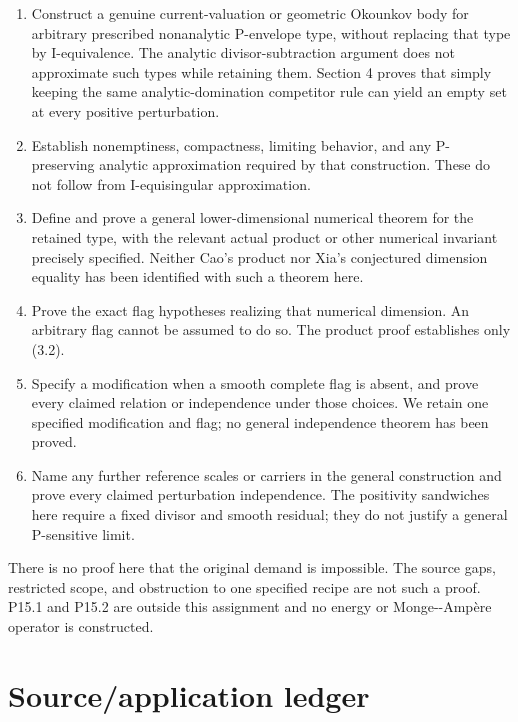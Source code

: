 \documentclass[11pt]{article}
\begin{document}
\begin{enumerate}
\item[1.] Construct a genuine current-\allowbreak{}valuation or geometric Okounkov body for arbitrary prescribed nonanalytic P-\allowbreak{}envelope type, without replacing that type by I-\allowbreak{}equivalence. The analytic divisor-\allowbreak{}subtraction argument does not approximate such types while retaining them. Section 4 proves that simply keeping the same analytic-\allowbreak{}domination competitor rule can yield an empty set at every positive perturbation.
\item[2.] Establish nonemptiness, compactness, limiting behavior, and any P-\allowbreak{}preserving analytic approximation required by that construction. These do not follow from I-\allowbreak{}equisingular approximation.
\item[3.] Define and prove a general lower-\allowbreak{}dimensional numerical theorem for the retained type, with the relevant actual product or other numerical invariant precisely specified. Neither Cao's product nor Xia's conjectured dimension equality has been identified with such a theorem here.
\item[4.] Prove the exact flag hypotheses realizing that numerical dimension. An arbitrary flag cannot be assumed to do so. The product proof establishes only (3.2).
\item[5.] Specify a modification when a smooth complete flag is absent, and prove every claimed relation or independence under those choices. We retain one specified modification and flag; no general independence theorem has been proved.
\item[6.] Name any further reference scales or carriers in the general construction and prove every claimed perturbation independence. The positivity sandwiches here require a fixed divisor and smooth residual; they do not justify a general P-\allowbreak{}sensitive limit.

\end{enumerate}
There is no proof here that the original demand is impossible. The source gaps, restricted scope, and obstruction to one specified recipe are not such a proof. P15.1 and P15.2 are outside this assignment and no energy or Monge-\allowbreak{}-\allowbreak{}Ampère operator is constructed.


\section{Source/\allowbreak{}application ledger}
\end{document}
